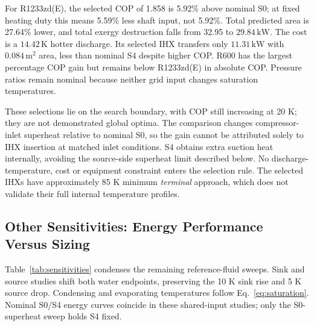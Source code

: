 \documentclass[11pt,a4paper]{article}
\begin{document}
For R1233zd(E), the selected COP of 1.858 is 5.92\% above nominal S0;
at fixed heating duty this means 5.59\% less shaft input, not 5.92\%.
Total predicted area is 27.64\% lower, and total exergy destruction falls
from 32.95 to $29.84\,\mathrm{kW}$. The cost is a
$14.42\,\mathrm{K}$ hotter discharge. Its selected IHX transfers only
$11.31\,\mathrm{kW}$ with $0.084\,\mathrm{m^2}$ area, less than nominal
S4 despite higher COP. R600 has the largest percentage COP gain but remains
below R1233zd(E) in absolute COP. Pressure ratios remain nominal because
neither grid input changes saturation temperatures.

These selections lie on the search boundary, with COP still increasing at
20 K; they are not demonstrated global optima. The comparison changes
compressor-inlet superheat relative to nominal S0, so the gain cannot be
attributed solely to IHX insertion at matched inlet conditions. S4 obtains
extra suction heat internally, avoiding the source-side superheat limit
described below. No discharge-temperature, cost or equipment constraint
enters the selection rule. The selected IHXs have approximately 85 K
minimum \emph{terminal} approach, which does not validate their full
internal temperature profiles.

\clearpage
\subsection{Other Sensitivities: Energy Performance Versus Sizing}
\label{sec:sensitivities}
Table~\ref{tab:sensitivities} condenses the remaining reference-fluid sweeps.
Sink and source studies shift both water endpoints, preserving the 10 K
sink rise and 5 K source drop. Condensing and evaporating temperatures
follow Eq.~\eqref{eq:saturation}. Nominal S0/S4 energy curves coincide in
these shared-input studies; only the S0-superheat sweep holds S4 fixed.
\end{document}
